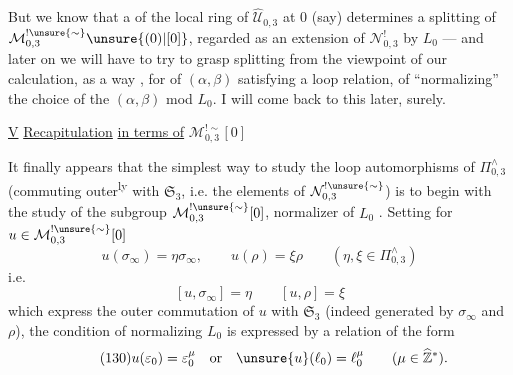 But we know that a 
of the local ring of $\widehat{\mathcal U}_{0,3}$ at $0$ (say)
determines a splitting of
$\mathcal M_{0,3}^{!\unsure{\sim}}\unsure{(0)|[0]}$, regarded as
an extension of $\mathcal N_{0,3}^{!}$ by $L_0$ --- and later on we will have to
try to grasp 
splitting 
from the viewpoint of our calculation, as a  way
, for 
\deleted{$\alpha,\beta$}   of $(\alpha,\beta)$
satisfying a loop relation, of ``normalizing'' the choice of the
$(\alpha,\beta)$ mod $L_0$.
I will come back to this later, surely.


\uline{V} \uline{Recapitulation} \uline{in terms of}
$\mathcal M_{0,3}^{!\sim}[0]$

It finally appears that the simplest way to study the loop
automorphisms of $\Pi_{0,3}^{\wedge}$ (commuting outer\textsuperscript{ly}
with $\mathfrak S_3$, i.e. the elements of 
$\mathcal N_{0,3}^{!\unsure{\sim}}$) is to begin with the study of the
subgroup $\mathcal M_{0,3}^{!\unsure{\sim}}[0]$, normalizer
of $L_0$ .
Setting for $u\in\mathcal M_{0,3}^{!\unsure{\sim}}[0]$
\[
\tag{128}
u(\sigma_\infty)=\eta\sigma_\infty,
\qquad u(\rho)=\xi\rho
\qquad(\eta,\xi\in\Pi_{0,3}^{\wedge})
\]
i.e.
\[
\tag{129}
[u,\sigma_\infty]=\eta\qquad [u,\rho]=\xi
\]
which express the outer commutation of $u$ with $\mathfrak S_3$
(indeed generated by $\sigma_\infty$ and $\rho$), the condition of
normalizing $L_0$ is expressed by a relation of the form
\[
\tag{130}
u(\varepsilon_0)=\varepsilon_0^\mu
\quad\text{or}\quad \unsure{u}(\ell_0)=\ell_0^\mu
\qquad(\mu\in\widehat{\mathbb Z}^{*}).
\]


